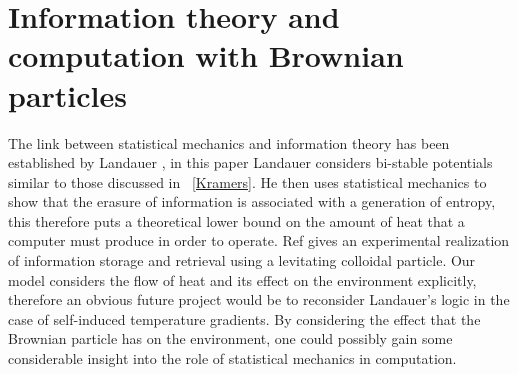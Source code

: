 \section{Information theory and computation with Brownian particles}
The link between statistical mechanics and information theory has been established by Landauer \cite{Landauer1961}, in this paper Landauer considers bi-stable potentials similar to those discussed in ~\autoref{Kramers}. He then uses statistical mechanics to show that the erasure of information is associated with a generation of entropy, this therefore puts a theoretical lower bound on the amount of heat that a computer must produce in order to operate. Ref \cite{MyersCelebranoKrishnan2015} gives an experimental realization of information storage and retrieval using a levitating colloidal particle. Our model considers the flow of heat and its effect on the environment explicitly, therefore an obvious future project would be to reconsider Landauer's logic in the case of self-induced temperature gradients. By considering the effect that the Brownian particle has on the environment, one could possibly gain some considerable insight into the role of statistical mechanics in computation.

